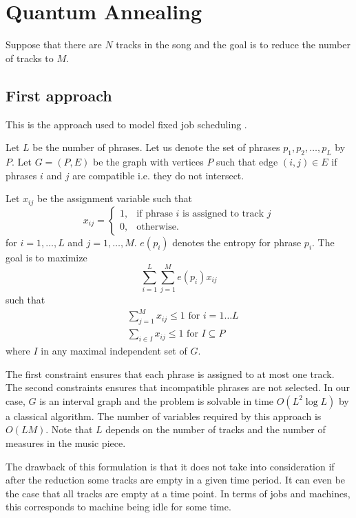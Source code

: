 \documentclass[11pt,a4paper]{article}
\begin{document}
\section{Quantum Annealing}



Suppose that there are $ N $ tracks in the song and the goal is to reduce the number of tracks to $ M $.
\subsection{First approach}

This is the approach used to model fixed job scheduling \cite{arkin1987scheduling, barcia2005k}. 

Let $L $ be the number of phrases. Let us denote the set of phrases $ p_1,p_2,\dots,p_L $ by $ P $. Let $ G=(P,E) $ be the graph with vertices $ P $ such that edge $(i,j) \in E$ if phrases $ i $ and $ j $ are compatible i.e. they do not intersect.

Let $ x_{ij} $ be the assignment variable such that
\begin{equation}
x_{ij} =   \begin{cases}%
1,      & \text{if phrase $i$ is assigned to track $j$}\\
0, & \text{otherwise.}
\end{cases}
\end{equation}
 for $ i = 1, \dots ,L $ and $ j=1, \dots ,M  $. $ e(p_i) $ denotes the entropy for phrase $ p_i $. The goal is to maximize 
\begin{equation}
\sum_{i=1}^L \sum_{j=1}^M e(p_{i})x_{ij}	
 \end{equation}
 such that
 \begin{align}
 &\sum_{j=1}^M x_{ij} \leq 1 \mbox{ for }i=1\dots L \\
 &\sum_{i \in I} x_{ij} \leq 1 \mbox{ for } I \subseteq P
 \end{align}
 where $ I $ in any maximal independent set of $ G $.


The first constraint ensures that each phrase is assigned to at most one track. The second constraints ensures that incompatible phrases are not selected. In our case, $ G $ is an interval graph and the problem is solvable in time $ O(L^2 \log L) $ by a classical algorithm. The number of variables required by this approach is $ O(LM) $. Note that $ L $ depends on the number of tracks and the number of measures in the music piece.

The drawback of this formulation is that it does not take into consideration if after the reduction some tracks are empty in a given time period. It can even be the case that all tracks are empty at a time point. In terms of jobs and machines, this corresponds to machine being idle for some time. 
\end{document}
